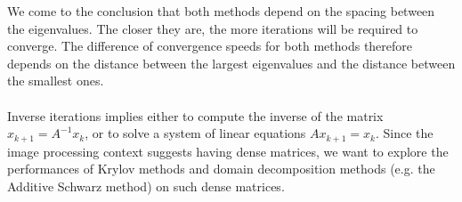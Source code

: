 We come to the conclusion that both methods depend on the spacing between the eigenvalues.
The closer they are, the more iterations will be required to converge.
The difference of convergence speeds for both methods therefore depends on the distance between the largest eigenvalues and the distance between the smallest ones.

\paragraph{}
Inverse iterations implies either to compute the inverse of the matrix \(x_{k+1} = A^{-1}x_k\), or to solve a system of linear equations \(Ax_{k+1} = x_k\).
Since the image processing context suggests having dense matrices, we want to explore the performances of Krylov methods and domain decomposition methods (e.g. the Additive Schwarz method) on such dense matrices.
